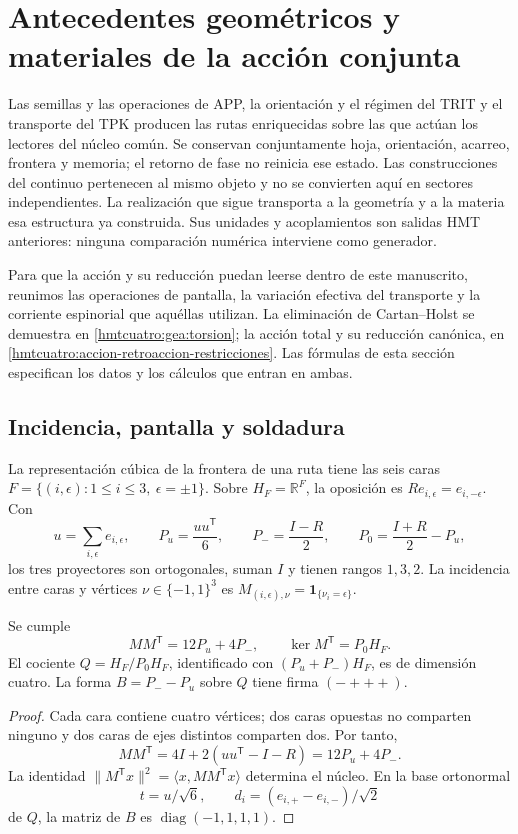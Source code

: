 \section{Antecedentes geométricos y materiales de la acción conjunta}
\label{hmtcuatro:ant:seccion}

Las semillas y las operaciones de APP, la orientación y el régimen
del TRIT y el transporte del TPK producen las rutas enriquecidas sobre
las que actúan los lectores del núcleo común. Se conservan conjuntamente
hoja, orientación, acarreo, frontera y memoria; el retorno de fase no
reinicia ese estado. Las construcciones del continuo pertenecen al mismo
objeto y no se convierten aquí en sectores independientes. La
realización que sigue transporta a la geometría y a la materia esa
estructura ya construida. Sus unidades y acoplamientos son salidas
HMT anteriores: ninguna comparación numérica interviene como generador.

Para que la acción y su reducción puedan leerse dentro de este
manuscrito, reunimos las operaciones de pantalla, la variación efectiva
del transporte y la corriente espinorial que aquéllas utilizan. La
eliminación de Cartan--Holst se demuestra en
\ref{hmtcuatro:gea:torsion}; la acción total y su reducción canónica,
en \ref{hmtcuatro:accion-retroaccion-restricciones}. Las fórmulas de
esta sección especifican los datos y los cálculos que entran en ambas.

\subsection{Incidencia, pantalla y soldadura}
\label{hmtcuatro:ant:pantalla}

La representación cúbica de la frontera de una ruta tiene las seis
caras \(F=\{(i,\epsilon):1\leq i\leq3,\ \epsilon=\pm1\}\).
Sobre \(H_F=\mathbb R^F\), la oposición es
\(Re_{i,\epsilon}=e_{i,-\epsilon}\). Con
\[
 u=\sum_{i,\epsilon}e_{i,\epsilon},\qquad
 P_u=\frac{uu^{\mathsf T}}6,\qquad
 P_-=\frac{I-R}2,\qquad
 P_0=\frac{I+R}2-P_u ,
\]
los tres proyectores son ortogonales, suman \(I\) y tienen rangos
\(1,3,2\). La incidencia entre caras y vértices
\(\nu\in\{-1,1\}^3\) es
\(M_{(i,\epsilon),\nu}=\mathbf1_{\{\nu_i=\epsilon\}}\).

\begin{proposition}
\label{hmtcuatro:ant:prop-pantalla}
Se cumple
\[
 MM^{\mathsf T}=12P_u+4P_-,\qquad
 \ker M^{\mathsf T}=P_0H_F .
\]
El cociente \(Q=H_F/P_0H_F\), identificado con
\((P_u+P_-)H_F\), es de dimensión cuatro. La forma
\(B=P_--P_u\) sobre \(Q\) tiene firma \((-+++)\).
\end{proposition}
\begin{proof}
Cada cara contiene cuatro vértices; dos caras opuestas no comparten
ninguno y dos caras de ejes distintos comparten dos. Por tanto,
\[
 MM^{\mathsf T}=4I+2(uu^{\mathsf T}-I-R)
              =12P_u+4P_- .
\]
La identidad
\(\|M^{\mathsf T}x\|^2=\langle x,MM^{\mathsf T}x\rangle\)
determina el núcleo. En la base ortonormal
\[
 t=u/\sqrt6,\qquad d_i=(e_{i,+}-e_{i,-})/\sqrt2
\]
de \(Q\), la matriz de \(B\) es \(\operatorname{diag}(-1,1,1,1)\).
\end{proof}

